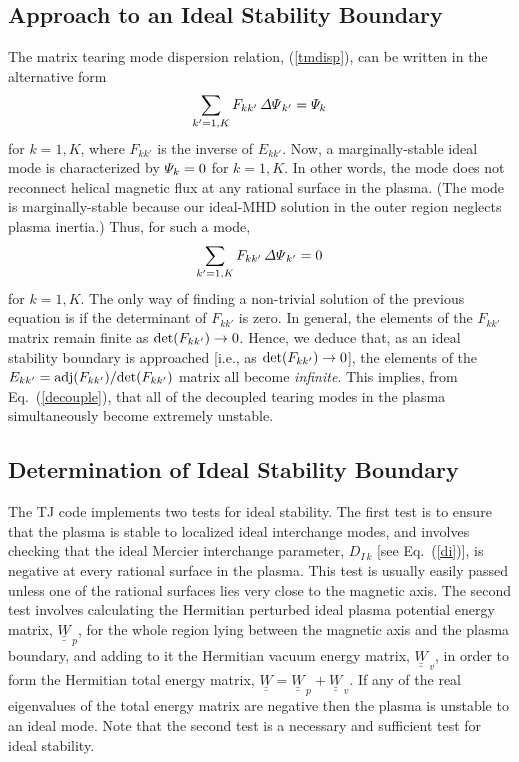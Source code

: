 \documentclass[12pt,prb,aps]{revtex4-1}
\begin{document}
\subsection{Approach to an Ideal Stability Boundary}\label{approach}
The matrix tearing mode dispersion relation, (\ref{tmdisp}), can be written in the alternative form\,\cite{am1}
\begin{equation}
\sum_{k'=1,K} F_{kk'}\,{\mit\Delta\Psi}_{k'} = {\mit\Psi}_k
\end{equation}
for $k=1,K$, where $F_{kk'}$ is the inverse of $E_{kk'}$. Now, a marginally-stable ideal mode is characterized by ${\mit\Psi}_k=0$ for $k=1,K$. In other words, the
mode does not reconnect helical magnetic flux at any rational surface in the plasma.  (The mode is marginally-stable
because our ideal-MHD solution in the outer region neglects plasma inertia.) Thus, for such a mode, 
\begin{equation}
\sum_{k'=1,K} F_{kk'}\,{\mit\Delta\Psi}_{k'} =0
\end{equation}
for $k=1,K$. The only way of finding a non-trivial solution of the previous equation is if the determinant of $F_{kk'}$ is zero. In general, the elements of
the $F_{kk'}$ matrix remain finite as ${\rm det}(F_{kk'})\rightarrow 0$.\cite{am1} Hence, we deduce that, as an ideal stability boundary is approached
[i.e., as ${\rm det}(F_{kk'})\rightarrow 0$], the elements of the $E_{kk'}= {\rm adj}(F_{kk'})/{\rm det}(F_{kk'})$ matrix  all become {\em infinite}. This implies, from Eq.~(\ref{decouple}), that all
of the decoupled tearing modes in the plasma simultaneously become extremely unstable.\cite{brennan,bren1,bren2} 

\subsection{Determination of Ideal Stability Boundary}\label{determine}
The TJ code implements two tests for ideal stability. The first test is to ensure that the plasma is stable to localized ideal interchange modes, and
involves checking that the ideal Mercier interchange parameter, $D_{I\,k}$ [see Eq.~(\ref{di})], is negative at every rational surface in the plasma.\cite{mercier,dcon} This test is usually easily passed
unless one of the rational surfaces  lies very close to the magnetic axis.
 The second test  involves calculating the Hermitian perturbed ideal plasma potential energy
matrix, $\underline{\underline{W}}_{\,p}$,  for the whole  region lying  between the magnetic axis and the plasma boundary, and adding to it the Hermitian vacuum energy matrix,  $\underline{\underline{W}}_{\,v}$,  in order to
form the Hermitian  total energy matrix, $\underline{\underline{W}} =\underline{\underline{W}}_{\,p} +  \underline{\underline{W}}_{\,v}$.\cite{ideal} If any of the real eigenvalues
of the total energy matrix are negative then the plasma is unstable to an ideal mode.  Note that the second test is a necessary and sufficient test for ideal stability.\cite{freidberg}
\end{document}
